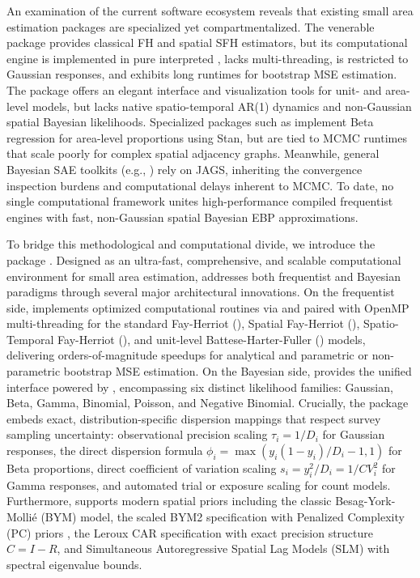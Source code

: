 An examination of the current  software ecosystem reveals that existing small area estimation packages are specialized yet compartmentalized. The venerable  package \citep{molina2015sae} provides classical FH and spatial SFH estimators, but its computational engine is implemented in pure interpreted , lacks multi-threading, is restricted to Gaussian responses, and exhibits long runtimes for bootstrap MSE estimation. The  package \citep{kreutzmann2019emdi} offers an elegant interface and visualization tools for unit- and area-level models, but lacks native spatio-temporal AR(1) dynamics and non-Gaussian spatial Bayesian likelihoods. Specialized packages such as  \citep{denicolo2022tipsae} implement Beta regression for area-level proportions using Stan, but are tied to MCMC runtimes that scale poorly for complex spatial adjacency graphs. Meanwhile, general Bayesian SAE toolkits (e.g., ) rely on JAGS, inheriting the convergence inspection burdens and computational delays inherent to MCMC. To date, no single computational framework unites high-performance compiled frequentist engines with fast, non-Gaussian spatial Bayesian EBP approximations.

To bridge this methodological and computational divide, we introduce the  package . Designed as an ultra-fast, comprehensive, and scalable computational environment for small area estimation,  addresses both frequentist and Bayesian paradigms through several major architectural innovations. On the frequentist side,  implements optimized  computational routines via  and  paired with OpenMP multi-threading for the standard Fay-Herriot (), Spatial Fay-Herriot (), Spatio-Temporal Fay-Herriot (), and unit-level Battese-Harter-Fuller () models, delivering orders-of-magnitude speedups for analytical and parametric or non-parametric bootstrap MSE estimation. On the Bayesian side,  provides the unified  interface powered by , encompassing six distinct likelihood families: Gaussian, Beta, Gamma, Binomial, Poisson, and Negative Binomial. Crucially, the package embeds exact, distribution-specific dispersion mappings that respect survey sampling uncertainty: observational precision scaling $\tau_i = 1/D_i$ for Gaussian responses, the \citet{janicki2020properties} direct dispersion formula $\phi_i = \max(y_i(1-y_i)/D_i - 1, 1)$ for Beta proportions, direct coefficient of variation scaling $s_i = y_i^2/D_i = 1/CV_i^2$ for Gamma responses, and automated trial or exposure scaling for count models. Furthermore,  supports modern spatial priors including the classic Besag-York-Molli\'e (BYM) model, the scaled BYM2 specification with Penalized Complexity (PC) priors \citep{simpson2017penalising}, the Leroux CAR specification with exact precision structure $C = I - R$, and Simultaneous Autoregressive Spatial Lag Models (SLM) with spectral eigenvalue bounds.


